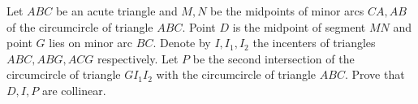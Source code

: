 Let $ABC$ be an acute triangle and $M,N$ be the midpoints of minor arcs $CA,AB$ of the circumcircle of triangle $ABC$. Point $D$ is the midpoint of segment $MN$ and point $G$ lies on minor arc $BC$. Denote by $I,I_1,I_2$ the incenters of triangles $ABC,ABG,ACG$ respectively. Let $P$ be the second intersection of the circumcircle of triangle $GI_1I_2$ with the circumcircle of triangle $ABC$. Prove that $D,I,P$ are collinear.